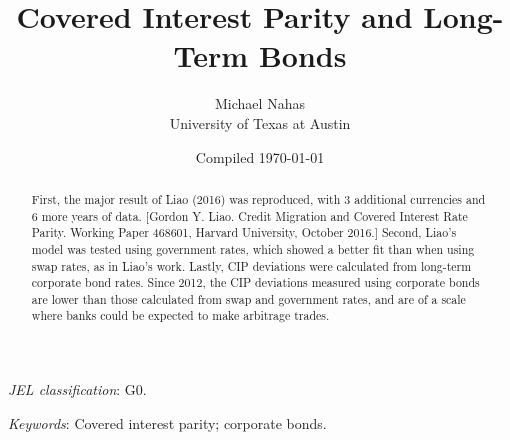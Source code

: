 \documentclass[12pt]{article}
\begin{document}

\title{Covered Interest Parity and Long-Term Bonds}

\author{Michael Nahas \\ University of Texas at Austin}

\date{Compiled \today}


\renewcommand{\thefootnote}{\fnsymbol{footnote}}

\singlespacing

\maketitle

\vspace{-.2in}
\begin{abstract}
\noindent First, the major result of Liao (2016) was reproduced, with 3 additional currencies and 6 more years of data.  [Gordon Y. Liao. Credit Migration and Covered Interest Rate Parity. Working Paper 468601, Harvard University, October 2016.]   Second, Liao's model was tested using government rates, which showed a better fit than when using swap rates, as in Liao's work.  Lastly, CIP deviations were calculated from long-term corporate bond rates.  Since 2012, the CIP deviations measured using corporate bonds are lower than those calculated from swap and government rates, and are of a scale where banks could be expected to make arbitrage trades.  
\end{abstract}

\medskip

\noindent \textit{JEL classification}: G0.

\medskip
\noindent \textit{Keywords}: Covered interest parity; corporate bonds.

\thispagestyle{empty}

\clearpage

\onehalfspacing
\setcounter{footnote}{0}
\renewcommand{\thefootnote}{\arabic{footnote}}
\setcounter{page}{1}



\clearpage


\appendix



\clearpage 




\clearpage 




\end{document}
